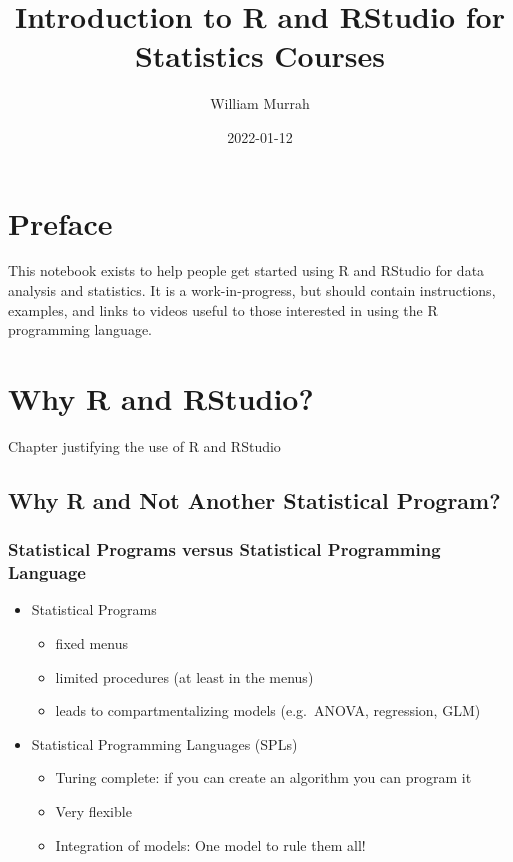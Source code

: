 \documentclass[
]{book}
\title{Introduction to R and RStudio for Statistics Courses}
\author{William Murrah}
\date{2022-01-12}
\providecommand{\tightlist}{%
  \setlength{\itemsep}{0pt}\setlength{\parskip}{0pt}}
\begin{document}
\maketitle

{
\setcounter{tocdepth}{1}
\tableofcontents
}
\hypertarget{preface}{%
\chapter*{Preface}\label{preface}}

This notebook exists to help people get started using R and RStudio for data analysis and statistics.
It is a work-in-progress, but should contain instructions, examples, and links to videos useful to those interested in using the R programming language.

\hypertarget{intro}{%
\chapter{Why R and RStudio?}\label{intro}}

Chapter justifying the use of R and RStudio

\hypertarget{why-r-and-not-another-statistical-program}{%
\section{Why R and Not Another Statistical Program?}\label{why-r-and-not-another-statistical-program}}

\hypertarget{statistical-programs-versus-statistical-programming-language}{%
\subsection{Statistical Programs versus Statistical Programming Language}\label{statistical-programs-versus-statistical-programming-language}}

\begin{itemize}
\tightlist
\item
  Statistical Programs

  \begin{itemize}
  \tightlist
  \item
    fixed menus
  \item
    limited procedures (at least in the menus)
  \item
    leads to compartmentalizing models (e.g.~ANOVA, regression, GLM)
  \end{itemize}
\item
  Statistical Programming Languages (SPLs)

  \begin{itemize}
  \tightlist
  \item
    Turing complete: if you can create an algorithm you can program it
  \item
    Very flexible
  \item
    Integration of models: One model to rule them all!
  \end{itemize}
\end{itemize}
\end{document}

